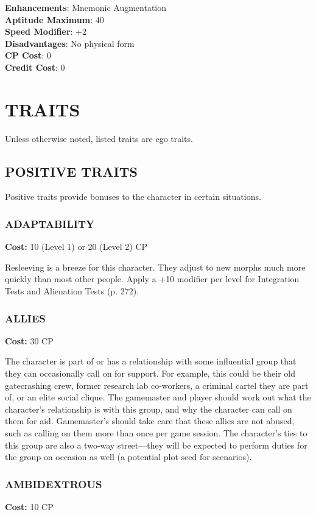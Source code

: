 \textbf{Enhancements}: Mnemonic Augmentation \\
\textbf{Aptitude Maximum}: 40 \\
\textbf{Speed Modifier}: +2 \\
\textbf{Disadvantages}: No physical form\\
\textbf{CP Cost}: 0 \\
\textbf{Credit Cost}: 0

\section{TRAITS}
Unless otherwise noted, listed traits are ego traits.

\subsection{POSITIVE TRAITS}
Positive traits provide bonuses to the character in certain situations.

\subsubsection{ADAPTABILITY}
\textbf{Cost:} 10 (Level 1) or 20 (Level 2) CP

Resleeving is a breeze for this character. They adjust to new morphs much more
quickly than most other people. Apply a +10 modifier per level for Integration
Tests and Alienation Tests (p. 272).

\subsubsection{ALLIES}
\textbf{Cost:} 30 CP

The character is part of or has a relationship with some influential group that
they can occasionally call on for support. For example, this could be their old
gatecrashing crew, former research lab co-workers, a criminal cartel they are
part of, or an elite social clique. The gamemaster and player should work out
what the character’s relationship is with this group, and why the character can
call on them for aid.  Gamemaster’s should take care that these allies are not
abused, such as calling on them more than once per game session. The
character’s ties to this group are also a two-way street—they will be expected
to perform duties for the group on occasion as well (a potential plot seed for
scenarios).

\subsubsection{AMBIDEXTROUS}
\textbf{Cost:} 10 CP

